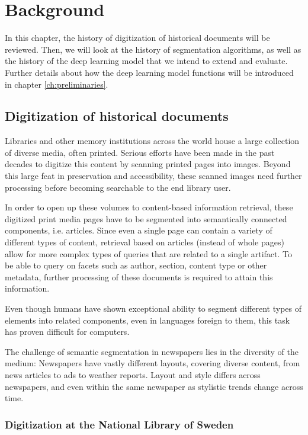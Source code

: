 \documentclass[english, bibtex]{kththesis}
\begin{document}
\cleardoublepage
\chapter{Background}
\label{ch:background}

In this chapter, the history of digitization of historical documents will be reviewed. Then, we will look at the history of segmentation algorithms, as well as the history of the deep learning model that we intend to extend and evaluate. Further details about how the deep learning model functions will be introduced in chapter \ref{ch:preliminaries}. 

\section{Digitization of historical documents}

Libraries and other memory institutions across the world house a large collection of diverse media, often printed. Serious efforts have been made in the past decades to digitize this content by scanning printed pages into images. Beyond this large feat in preservation and accessibility, these scanned images need further processing before becoming searchable to the end library user. 

In order to open up these volumes to content-based information retrieval, these digitized print media pages have to be segmented into semantically connected components, i.e. articles. Since even a single page can contain a variety of different types of content, retrieval based on articles (instead of whole pages) allow for more complex types of queries that are related to a single artifact. To be able to query on facets such as author, section, content type or other metadata, further processing of these documents is required to attain this information.  

Even though humans have shown exceptional ability to segment different types of elements into related components, even in languages foreign to them\cite{8270006}, this task has proven difficult for computers. 

The challenge of semantic segmentation in newspapers lies in the diversity of the medium: Newspapers have vastly different layouts, covering diverse content, from news articles to ads to weather reports. Layout and style differs across newspapers, and even within the same newspaper as stylistic trends change across time. 


\subsection{Digitization at the National Library of Sweden}
\end{document}
